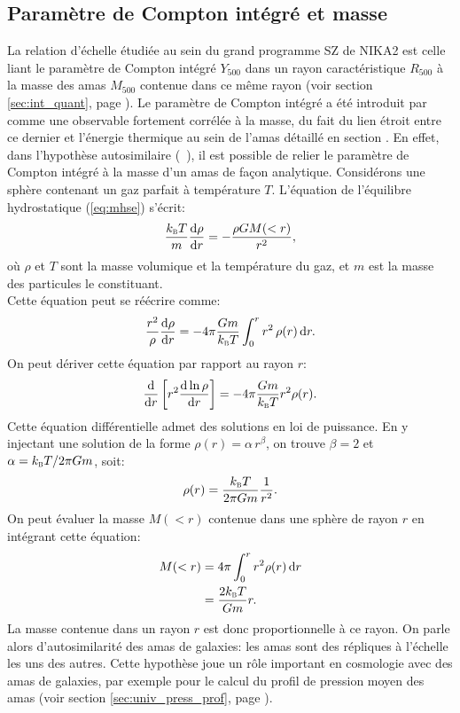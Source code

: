 \subsection{Paramètre de Compton intégré et masse}
\label{sec:scaling:sz}

La relation d'échelle étudiée au sein du grand programme SZ de NIKA2 est celle liant le paramètre de Compton intégré $Y_{500}$ dans un rayon caractéristique $R_{500}$ à la masse des amas $M_{500}$ contenue dans ce même rayon (voir section \ref{sec:int_quant}, page \pageref{sec:int_quant}).
Le paramètre de Compton intégré a été introduit par  comme une observable fortement corrélée à la masse, du fait du lien étroit entre ce dernier et l'énergie thermique au sein de l'amas détaillé en section .
En effet, dans l'hypothèse autosimilaire (\eg\ \cite{kravtsov_new_2006, kaiser_evolution_1991}), il est possible de relier le paramètre de Compton intégré à la masse d'un amas de façon analytique.
Considérons une sphère contenant un gaz parfait à température $T$.
L'équation de l'équilibre hydrostatique (\ref{eq:mhse}) s'écrit:
\begin{equation}
    \frac{k_\textsc{b} T}{m} \frac{\mathrm{d} \rho}{\mathrm{d} r} = -\frac{\rho G M(<r)}{r^2},
\end{equation}
où $\rho$ et $T$ sont la masse volumique et la température du gaz, et $m$ est la masse des particules le constituant. \\
Cette équation peut se réécrire comme:
\begin{equation}
    \frac{r^2}{\rho} \frac{\mathrm{d} \rho}{\mathrm{d} r} = -4 \pi \frac{Gm}{k_\textsc{b} T} \int_0^r r^2 \, \rho(r) \, \mathrm{d} r.
\end{equation}
On peut dériver cette équation par rapport au rayon $r$:
\begin{equation}
    \frac{\mathrm{d}}{\mathrm{d} r} \left[ r^2 \frac{\mathrm{d} \ln \rho}{\mathrm{d} r}\right] = -4\pi\frac{Gm}{k_\textsc{b}T} r^2 \rho(r).
\end{equation}
Cette équation différentielle admet des solutions en loi de puissance.
En y injectant une solution de la forme $\rho(r) = \alpha \, r^\beta$, on trouve $\beta=2$ et $\alpha=k_\textsc{b} T / 2\pi G m$, soit:
\begin{equation}
    \rho(r) = \frac{k_\textsc{b} T}{2\pi G m} \frac{1}{r^2}.
\end{equation}
On peut évaluer la masse $M(<r)$ contenue dans une sphère de rayon $r$ en intégrant cette équation:
\begin{align}
    \nonumber M(<r) &= 4\pi \int_0^r r^2 \rho(r) \, \mathrm{d} r \\
    &= \frac{2 k_\textsc{b} T}{Gm}r.
    \label{eq:scaling:t_m_r}
\end{align}
La masse contenue dans un rayon $r$ est donc proportionnelle à ce rayon.
On parle alors d'autosimilarité des amas de galaxies: les amas sont des répliques à l'échelle les uns des autres.
Cette hypothèse joue un rôle important en cosmologie avec des amas de galaxies, par exemple pour le calcul du profil de pression moyen des amas (voir section \ref{sec:univ_press_prof}, page \pageref{sec:univ_press_prof}).

